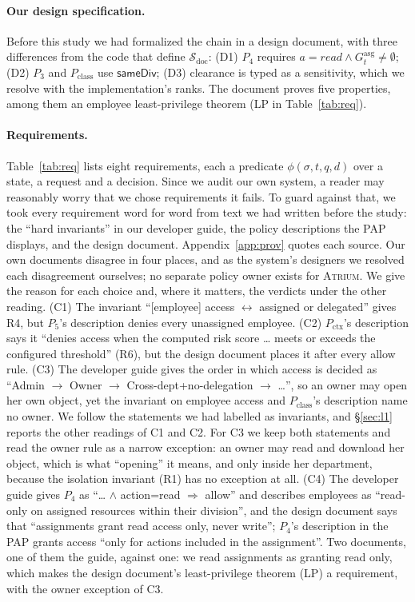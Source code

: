 \documentclass[sigconf,review,anonymous]{acmart}
\newcommand{\sysname}{\textsc{Atrium}\xspace}
\newcommand{\sysname}{\textsc{OpenZTAC}\xspace}
\newcommand{\Pc}{P_{\mathrm{class}}}
\newcommand{\Px}{P_{\mathrm{ctx}}}
\newcommand{\Gasg}{G^{\mathrm{asg}}}
\newcommand{\sameDiv}{\mathsf{sameDiv}}
\begin{document}
\paragraph{Our design specification.} Before this study we had formalized the chain in a design document,
with three differences from the code that define $\mathcal{S}_{\mathrm{doc}}$: (D1) $P_4$ requires
$a=\mathit{read}\wedge\Gasg_t\neq\emptyset$; (D2) $P_3$ and $\Pc$ use $\sameDiv$; (D3) clearance is typed as a
sensitivity, which we resolve with the implementation's ranks. The document proves five properties, among them
an employee least-privilege theorem (LP in Table~\ref{tab:req}).

\paragraph{Requirements.} Table~\ref{tab:req} lists eight requirements, each a predicate $\phi(\sigma,t,q,d)$
over a state, a request and a decision. Since we audit our own system, a reader may reasonably worry that we
chose requirements it fails. To guard against that, we took every requirement word for word from text we had
written before the study: the ``hard invariants'' in our developer guide, the policy descriptions the PAP
displays, and the design document. Appendix~\ref{app:prov} quotes each source. Our own documents disagree in
four places, and as the system's designers we resolved each disagreement ourselves; no separate policy owner
exists for \sysname. We give the reason for each choice and, where it matters, the verdicts under the other
reading. (C1) The invariant ``[employee] access $\leftrightarrow$ assigned or delegated'' gives R4, but $P_5$'s
description denies every unassigned employee. (C2) $\Px$'s description says it ``denies access when the
computed risk score \ldots{} meets or exceeds the configured threshold'' (R6), but the design document places it
after every allow rule. (C3) The developer guide gives the order in which access is decided as ``Admin $\to$
Owner $\to$ Cross-dept+no-delegation $\to$ \ldots'', so an owner may open her own object, yet the invariant on
employee access and $\Pc$'s description name no owner. We follow the statements we had labelled as invariants,
and \S\ref{sec:l1} reports the other readings of C1 and C2. For C3 we keep both statements and read the owner
rule as a narrow exception: an owner may read and download her object, which is what ``opening'' it means,
and only inside her department, because the isolation invariant (R1) has no exception at all. (C4) The
developer guide gives $P_4$ as ``\ldots{} $\wedge$ action=read $\Rightarrow$ allow'' and describes employees as
``read-only on assigned resources within their division'', and the design document says that ``assignments grant read access only,
never write''; $P_4$'s description in the PAP grants access ``only for actions included in the assignment''.
Two documents, one of them the guide, against one: we read assignments as granting read only, which makes the
design document's least-privilege theorem (LP) a requirement, with the owner exception of C3.
\end{document}
